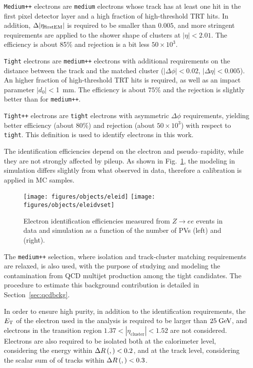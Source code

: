 \texttt{Medium++} electrons are \texttt{medium} electrons whose track
has at least one hit in the first pixel detector layer and a high
fraction of high-threshold TRT hits. In addition, $\Delta|\eta_{\rm
  first EM}|$ is required to be smaller than $0.005$, and more
stringent requirements are applied to the shower shape of clusters at
$|\eta|<2.01$. The efficiency is about 85\% and rejection is a bit
less $50\times 10^3$.

\texttt{Tight} electrons are \texttt{medium++} electrons with
additional requirements on the distance between the track and the
matched cluster ($|\Delta\phi|<0.02$, $|\Delta\eta|<0.005$). 
 An higher fraction of high-threshold TRT hits is required, as well as
 an impact parameter $|d_0|<$1~mm. 
The efficiency is about $75\%$ and the rejection is slightly better
than for \texttt{medium++}.

\texttt{Tight++} electrons are \texttt{tight} electrons with
asymmetric $\Delta\phi$ requirements, yielding better efficiency
(about $80\%$) and rejection (about $50\times 10^3$) with respect to
\texttt{tight}. This definition is used to identify electrons in this
work.

The identification efficiencies depend on the electron \pt{} and
pseudo--rapidity, while they are not strongly affected by pileup. As
shown in Fig.~\ref{fig:eleeff}, the modeling in simulation differs
slightly from what observed in data, therefore a calibration is
applied in MC samples.

\begin{figure}[htb!]\centering
  \texttt{[image: figures/objects/eleid]}
  \texttt{[image: figures/objects/eleidvset]}
  \caption{Electron identification efficiencies measured from
    $Z\to ee$ events in data and simulation as a function of the
    number of PVs (left) and ~\et{} (right).}
  \label{fig:eleeff}
\end{figure}

The \texttt{medium++} selection, where isolation and track-cluster matching
requirements are relaxed, is also used, with the purpose of studying
and modeling the contamination from QCD multijet production among the
tight candidates.
The procedure to estimate this background
contribution is detailed in Section~\ref{sec:qcdbckg}.

In order to ensure high purity, in addition to the identification
requirements, the $\mbox{\ensuremath{E_{\mathrm{T}}}}$ of the electron used in the analysis is required
to be larger than \mbox{$25 \; \mathrm{GeV}{}$}, and electrons in the transition
region $1.37<|\eta_{\mathrm{cluster}}|<1.52$ are not
considered. Electrons are also required to be isolated both at the
calorimeter level, considering the energy within $\Delta{}R\left(, \right)<0.2$,
and at the track level, considering the scalar sum of \pt{} of tracks
within $\Delta{}R\left(, \right)<0.3$.

